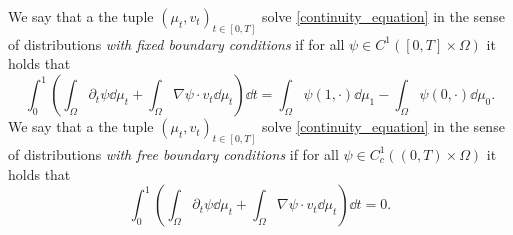 \begin{definition}
	\label{definition.solution_distributions}
	We say that a the tuple $(\mu_t, v_t)_{t \in [0,T]}$ solve \eqref{continuity_equation} in the sense of distributions {\em with fixed boundary conditions} if for all $\psi \in C^1([0,T]\times \Omega)$ it holds that 
	\begin{equation}
	\int_0^1\left(\int_{\Omega}\partial_t\psi \dd\mu_t + \int_{\Omega}\nabla\psi\cdot v_t\dd\mu_t\right)\dd t = \int_{\Omega}\psi(1,\cdot)\dd\mu_1 - \int_{\Omega}\psi(0,\cdot)\dd\mu_0.
	\end{equation}
	We say that a the tuple $(\mu_t, v_t)_{t \in [0,T]}$ solve \eqref{continuity_equation} in the sense of distributions {\em with free boundary conditions} if for all $\psi \in C^1_c((0,T)\times \Omega)$ it holds that 
	\begin{equation}
	\int_0^1\left(\int_{\Omega}\partial_t\psi \dd\mu_t + \int_{\Omega}\nabla\psi\cdot v_t\dd\mu_t\right)\dd t = 0.
	\end{equation}
\end{definition}


